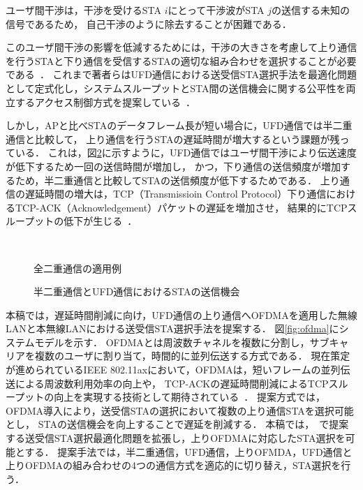 \documentclass[technicalreport]{ieicej}
\begin{document}
	ユーザ間干渉は，干渉を受けるSTA $i$にとって干渉波がSTA $j$の送信する未知の信号であるため，
	自己干渉のように除去することが困難である．
	\par
	このユーザ間干渉の影響を低減するためには，干渉の大きさを考慮して上り通信を行うSTAと下り通信を受信するSTAの適切な組み合わせを選択することが必要である~\cite{promac}．
	これまで著者らはUFD通信における送受信STA選択手法を最適化問題として定式化し，システムスループットとSTA間の送信機会に関する公平性を両立するアクセス制御方式を提案している~\cite{promac_fair}．
	\par
	しかし，APと比べSTAのデータフレーム長が短い場合に，UFD通信では半二重通信と比較して，
	上り通信を行うSTAの遅延時間が増大するという課題が残っている．
	これは，図\ref{fig:problem}に示すように，UFD通信ではユーザ間干渉により伝送速度が低下するため一回の送信時間が増加し，
	かつ，下り通信の送信頻度が増加するため，半二重通信と比較してSTAの送信頻度が低下するためである．
	上り通信の遅延時間の増大は，TCP（Transmissioin Control Protocol）下り通信におけるTCP-ACK（Acknowledgement）パケットの遅延を増加させ，
	結果的にTCPスループットの低下が生じる~\cite{rtt}．
	\begin{figure}[t]
		\centering
		\\
		\caption{全二重通信の適用例}
		\label{fig:topology}
	\end{figure}
	\begin{figure}[t]
		\centering
		\caption{半二重通信とUFD通信におけるSTAの送信機会}
		\label{fig:problem}
	\end{figure}
	\par
	本稿では，遅延時間削減に向け，UFD通信の上り通信へOFDMAを適用した無線LANと本無線LANにおける送受信STA選択手法を提案する．
	図\ref{fig:ofdma}にシステムモデルを示す．
	OFDMAとは周波数チャネルを複数に分割し，サブキャリアを複数のユーザに割り当て，時間的に並列伝送する方式である．
	現在策定が進められているIEEE 802.11axにおいて，OFDMAは，短いフレームの並列伝送による周波数利用効率の向上や，
	TCP-ACKの遅延時間削減によるTCPスループットの向上を実現する技術として期待されている~\cite{ofdma}．
	提案方式では，OFDMA導入により，送受信STAの選択において複数の上り通信STAを選択可能とし，
	STAの送信機会を向上することで遅延を削減する．
	本稿では，~\cite{promac_fair}で提案する送受信STA選択最適化問題を拡張し，上りOFDMAに対応したSTA選択を可能とする．
	提案手法では，半二重通信，UFD通信，上りOFMDA，UFD通信と上りOFDMAの組み合わせの4つの通信方式を適応的に切り替え，STA選択を行う．
\end{document}
